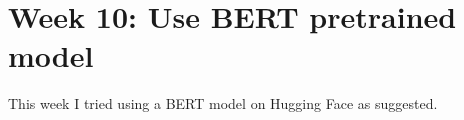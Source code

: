 \section*{Week 10: Use BERT pretrained model}

This week I tried using a BERT model on Hugging Face as suggested.


